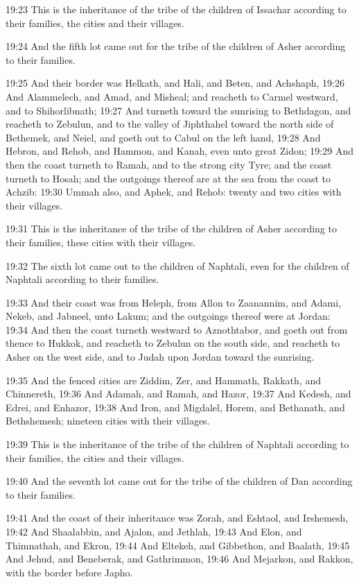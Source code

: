19:23 This is the inheritance of the tribe of the children of Issachar
according to their families, the cities and their villages.

19:24 And the fifth lot came out for the tribe of the children of
Asher according to their families.

19:25 And their border was Helkath, and Hali, and Beten, and Achshaph,
19:26 And Alammelech, and Amad, and Misheal; and reacheth to Carmel
westward, and to Shihorlibnath; 19:27 And turneth toward the sunrising
to Bethdagon, and reacheth to Zebulun, and to the valley of Jiphthahel
toward the north side of Bethemek, and Neiel, and goeth out to Cabul
on the left hand, 19:28 And Hebron, and Rehob, and Hammon, and Kanah,
even unto great Zidon; 19:29 And then the coast turneth to Ramah, and
to the strong city Tyre; and the coast turneth to Hosah; and the
outgoings thereof are at the sea from the coast to Achzib: 19:30 Ummah
also, and Aphek, and Rehob: twenty and two cities with their villages.

19:31 This is the inheritance of the tribe of the children of Asher
according to their families, these cities with their villages.

19:32 The sixth lot came out to the children of Naphtali, even for the
children of Naphtali according to their families.

19:33 And their coast was from Heleph, from Allon to Zaanannim, and
Adami, Nekeb, and Jabneel, unto Lakum; and the outgoings thereof were
at Jordan: 19:34 And then the coast turneth westward to Aznothtabor,
and goeth out from thence to Hukkok, and reacheth to Zebulun on the
south side, and reacheth to Asher on the west side, and to Judah upon
Jordan toward the sunrising.

19:35 And the fenced cities are Ziddim, Zer, and Hammath, Rakkath, and
Chinnereth, 19:36 And Adamah, and Ramah, and Hazor, 19:37 And Kedesh,
and Edrei, and Enhazor, 19:38 And Iron, and Migdalel, Horem, and
Bethanath, and Bethshemesh; nineteen cities with their villages.

19:39 This is the inheritance of the tribe of the children of Naphtali
according to their families, the cities and their villages.

19:40 And the seventh lot came out for the tribe of the children of
Dan according to their families.

19:41 And the coast of their inheritance was Zorah, and Eshtaol, and
Irshemesh, 19:42 And Shaalabbin, and Ajalon, and Jethlah, 19:43 And
Elon, and Thimnathah, and Ekron, 19:44 And Eltekeh, and Gibbethon, and
Baalath, 19:45 And Jehud, and Beneberak, and Gathrimmon, 19:46 And
Mejarkon, and Rakkon, with the border before Japho.

